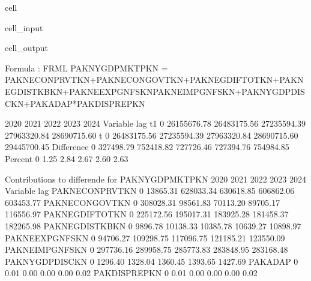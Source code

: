 \documentclass[letterpaper,10pt,english]{jupyterBook}
\begin{document}
\begin{sphinxuseclass}{cell}\begin{sphinxVerbatimInput}

\begin{sphinxuseclass}{cell_input}
\begin{sphinxVerbatim}[commandchars=\\\{\}]
 
    \PYG{p}{[}\PYG{p}{]}
\end{sphinxVerbatim}

\end{sphinxuseclass}\end{sphinxVerbatimInput}
\begin{sphinxVerbatimOutput}

\begin{sphinxuseclass}{cell_output}
\begin{sphinxVerbatim}[commandchars=\\\{\}]
Formula        : FRML  \PYGZlt{}\PYGZgt{} PAKNYGDPMKTPKN = PAKNECONPRVTKN+PAKNECONGOVTKN+PAKNEGDIFTOTKN+PAKNEGDISTKBKN+PAKNEEXPGNFSKN\PYGZhy{}PAKNEIMPGNFSKN+PAKNYGDPDISCKN+PAKADAP*PAKDISPREPKN \PYGZdl{} 

                      2020        2021        2022        2023        2024
Variable   lag                                                            
t\PYGZhy{}1        0   26155676.78 26483175.56 27235594.39 27963320.84 28690715.60
t          0   26483175.56 27235594.39 27963320.84 28690715.60 29445700.45
Difference 0     327498.79   752418.82   727726.46   727394.76   754984.85
Percent    0          1.25        2.84        2.67        2.60        2.63

 Contributions to differende for  PAKNYGDPMKTPKN
                         2020       2021       2022       2023       2024
Variable       lag                                                       
PAKNECONPRVTKN 0    \PYGZhy{}13865.31  628033.34  630618.85  606862.06  603453.77
PAKNECONGOVTKN 0    308028.31   98561.83   70113.20   89705.17  116556.97
PAKNEGDIFTOTKN 0    225172.56  195017.31  183925.28  181458.37  182265.98
PAKNEGDISTKBKN 0      9896.78   10138.33   10385.78   10639.27   10898.97
PAKNEEXPGNFSKN 0     94706.27  109298.75  117096.75  121185.21  123550.09
PAKNEIMPGNFSKN 0   \PYGZhy{}297736.16 \PYGZhy{}289958.75 \PYGZhy{}285773.83 \PYGZhy{}283848.95 \PYGZhy{}283168.48
PAKNYGDPDISCKN 0      1296.40    1328.04    1360.45    1393.65    1427.69
PAKADAP        0         0.01       0.00       0.00       0.00       0.02
PAKDISPREPKN   0         0.01       0.00       0.00       0.00       0.02


\end{sphinxVerbatim}
\end{sphinxuseclass}
\end{sphinxVerbatimOutput}
\end{sphinxuseclass}
\end{document}
